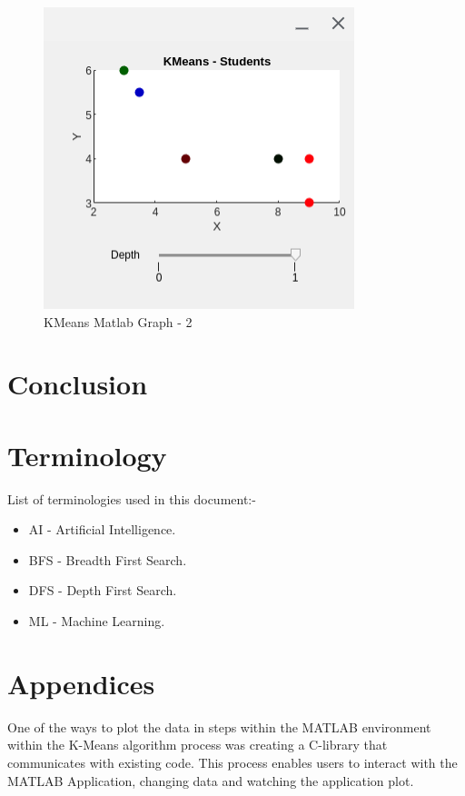 \documentclass[conference]{IEEEtran}
\begin{document}
      \begin{figure}[ht]
        \centering
        \includegraphics[width=0.65\columnwidth]{Figures/fig5.png}
        \caption{KMeans Matlab Graph - 2}
        \label{fig:kmeansMatlabGraph-2}
      \end{figure}

    \section{Conclusion}

    \section{Terminology}
      List of terminologies used in this document:-
      \begin{itemize}
        \item AI - Artificial Intelligence.
        \item BFS - Breadth First Search.
        \item DFS - Depth First Search.
        \item ML - Machine Learning.
      \end{itemize}

    \section{Appendices}
      One of the ways to plot the data in steps within the MATLAB environment within the K-Means algorithm process was creating a C-library that communicates with existing code. This process enables users to interact with the MATLAB Application, changing data and watching the application plot. 
      
\end{document}
